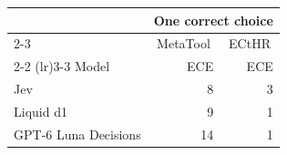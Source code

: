 \begin{tabular}{lrr}
\toprule
 & \multicolumn{2}{c}{One correct choice} \\
\cmidrule(lr){2-3}
 & \multicolumn{1}{c}{MetaTool} & \multicolumn{1}{c}{ECtHR} \\
\cmidrule(lr){2-2} \cmidrule(lr){3-3}
Model & ECE & ECE \\
\midrule
Jev & 8 & 3 \\
Liquid d1 & 9 & 1 \\
GPT-6 Luna Decisions & 14 & 1 \\
\bottomrule
\end{tabular}
